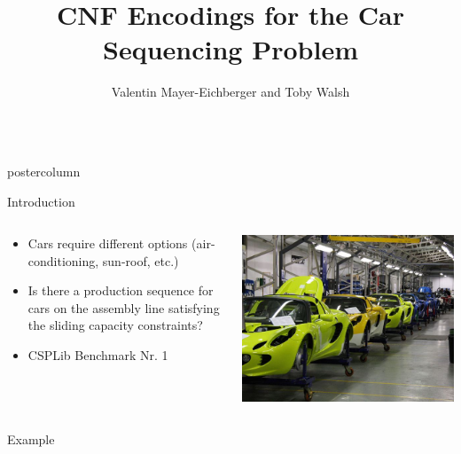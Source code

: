 \documentclass[final]{beamer}
\title{\huge CNF Encodings for the Car Sequencing Problem}
\author{Valentin Mayer-Eichberger and Toby Walsh}
\institute[UNSW]{NICTA and University of New South Wales, Australia}
\newlength{\columnheight}
\begin{document}
\begin{frame}
  \begin{columns}
    \begin{column}{.49\textwidth}
      \begin{beamercolorbox}[center,wd=\textwidth]{postercolumn}
        \begin{minipage}[T]{.95\textwidth}  %
          \parbox[t][\columnheight]{\textwidth}{ %
            \begin{block}{Introduction}
              \begin{columns}
                \begin{column}{.55\textwidth}
                    \begin{itemize}
                        \item Cars require different options (air-conditioning, sun-roof, etc.)
                        \item Is there a production sequence for cars on the assembly line satisfying the sliding capacity constraints?
                        \item CSPLib Benchmark Nr. 1
                    \end{itemize}
                \end{column}
                \begin{column}{.44\textwidth}
                  \centering
                    \includegraphics[width=0.80\linewidth]{figures/cars}
                \end{column}
            \end{columns}
            \end{block}
            \vfill
            \begin{block}{Example}


\end{block}}
\end{minipage}
\end{beamercolorbox}
\end{column}
\end{columns}
\end{frame}
\end{document}
